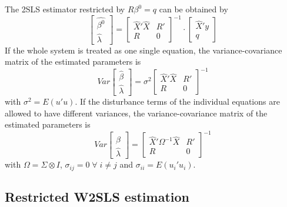 The 2SLS estimator restricted by $R \beta^0 = q$ can be obtained by
\begin{equation}
   \left[ \begin{array}{c}
      \widehat{\beta^0} \\ \widehat{\lambda}
   \end{array} \right]
   =
   \left[ \begin{array}{cc}
      \widehat{X}' \widehat{X} & R' \\ 
      R & 0
   \end{array} \right]^{-1}
   \cdot
   \left[ \begin{array}{c}
      \widehat{X}' y \\ q 
   \end{array} \right]
   \label{eq:beta2SLSr}
\end{equation}
If the whole system is treated as one single equation,
the variance-covariance matrix of the estimated parameters is
\begin{equation}
   Var 
   \left[ \begin{array}{c}
      \widehat{\beta} \\ \widehat{\lambda}
   \end{array} \right] 
   = \sigma^2 
   \left[ \begin{array}{cc}
      \widehat{X}' \widehat{X} & R' \\ 
      R & 0
   \end{array} \right]^{-1}
\end{equation}
with $\sigma^2 = E \left( u' u \right)$.
If the disturbance terms of the individual equations
are allowed to have different variances, 
the variance-covariance matrix of the estimated parameters is
\begin{equation}
   Var 
   \left[ \begin{array}{c}
      \widehat{\beta} \\ \widehat{\lambda}
   \end{array} \right] 
   = 
   \left[ \begin{array}{cc}
      \widehat{X}' \Omega^{-1} \widehat{X} & R' \\ 
      R & 0
   \end{array} \right]^{-1}
\end{equation}
with $\Omega = \Sigma \otimes I$, 
$\sigma_{ij} = 0 \; \forall \; i \neq j$ and
$\sigma_{ii} = E \left( u_i' u_i \right)$.


\subsection{Restricted W2SLS estimation}

